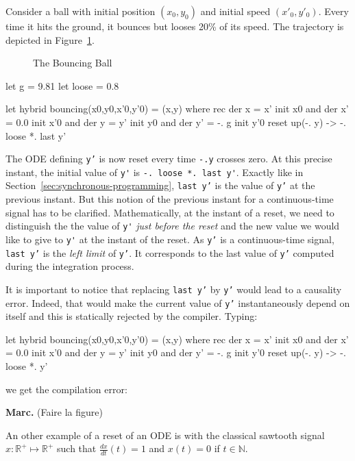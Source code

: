 \documentclass[11pt,titlepage,twoside]{report}
\newcommand{\DotNotation}[1]{\frac{\mathit{d}{#1}}{\mathit{dt}}}
\newcommand{\bR}{\mathbb{R}}
\newcommand{\bN}{\mathbb{N}}
\newcommand{\Marc}[1]{{\bf Marc.} ({#1})}
\begin{document}
Consider a ball with initial position $(x_0, y_0)$ and initial speed
$(x'_0, y'_0)$. Every time it hits the ground, it bounces but looses
20\% of its speed. The trajectory is depicted in Figure~\ref{fig:bouncing-ball}.

\begin{figure}
\caption{The Bouncing Ball~\label{fig:bouncing-ball}}
\end{figure}

\begin{runverbatim}[label=gravity]
let g = 9.81
let loose = 0.8
\end{runverbatim}
\begin{runverbatim}
let hybrid bouncing(x0,y0,x'0,y'0) = (x,y) where
 rec der x = x' init x0
 and der x' = 0.0 init x'0
 and der y = y' init y0
 and der y' = -. g init y'0 reset up(-. y) -> -. loose *. last y'
\end{runverbatim}

The \ac{ODE} defining \texttt{y'} is now reset every time \texttt{-.y}
crosses zero.  At this precise instant, the initial value of \verb-y'-
is \verb+-. loose *. last y'+. Exactly like in
Section~\ref{sec:synchronous-programming}, \texttt{last y'} is the
value of \texttt{y'} at the previous instant. But this notion of the
previous instant for a continuous-time signal has to be
clarified. Mathematically, at the instant of a reset, we need to
distinguish the the value of \verb-y'- \emph{just before the reset}
and the new value we would like to give to \verb-y'- at the instant of
the reset. As \texttt{y'} is a continuous-time signal, \texttt{last
  y'} is the \emph{left limit} of \texttt{y'}. It corresponds to the
last value of \texttt{y'} computed during the integration process.

It is important to notice that replacing \texttt{last y'} by
\texttt{y'} would lead to a causality error. Indeed, that would make
the current value of \texttt{y'} instantaneously depend on itself and
this is statically rejected by the compiler. Typing:

\begin{runverbatim}[include=gravity,fail]
let hybrid bouncing(x0,y0,x'0,y'0) = (x,y) where
 rec der x = x' init x0
 and der x' = 0.0 init x'0
 and der y = y' init y0
 and der y' = -. g init y'0 reset up(-. y) -> -. loose *. y'
\end{runverbatim}
we get the compilation error:
\runverbatimerr{}

\Marc{Faire la figure}

An other example of a reset of an \ac{ODE} is with the classical sawtooth
signal $x: \bR^+ \mapsto \bR^+$ such that $\DotNotation{x}(t) = 1$ and
$x(t) = 0$ if $t\in\bN$.
\end{document}
